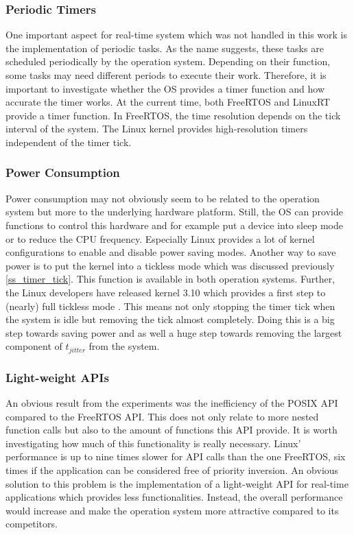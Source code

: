 \subsubsection{Periodic Timers}
One important aspect for real-time system which was not handled in this work is the implementation of periodic tasks.
As the name suggests, these tasks are scheduled periodically by the operation system.
Depending on their function, some tasks may need different periods to execute their work.
Therefore, it is important to investigate whether the \ac{OS} provides a timer function and how accurate the timer works.
At the current time, both FreeRTOS and LinuxRT provide a timer function.
In FreeRTOS, the time resolution depends on the tick interval of the system.
The Linux kernel provides high-resolution timers independent of the timer tick.

\subsubsection{Power Consumption}
Power consumption may not obviously seem to be related to the operation system but more to the underlying hardware platform.
Still, the \ac{OS} can provide functions to control this hardware and for example put a device into sleep mode or to reduce the \ac{CPU} frequency.
Especially Linux provides a lot of kernel configurations to enable and disable power saving modes.
Another way to save power is to put the kernel into a tickless mode which was discussed previously \ref{ss_timer_tick}.
This function is available in both operation systems.
Further, the Linux developers have released kernel 3.10 which provides a first step to (nearly) full tickless mode \cite{corbet:nftoi}.
This means not only stopping the timer tick when the system is idle but removing the tick almost completely. 
Doing this is a big step towards saving power and as well a huge step towards removing the largest component of $t_{jitter}$ from the system.

\subsubsection{Light-weight APIs}
An obvious result from the experiments was the inefficiency of the POSIX \ac{API} compared to the FreeRTOS \ac{API}.
This does not only relate to more nested function calls but also to the amount of functions this \ac{API} provide.
It is worth investigating how much of this functionality is really necessary.
Linux' performance is up to nine times slower for \ac{API} calls than the one FreeRTOS, six times if the application can be considered free of priority inversion.
An obvious solution to this problem is the implementation of a light-weight \ac{API} for real-time applications which provides less functionalities.
Instead, the overall performance would increase and make the operation system more attractive compared to its competitors.



